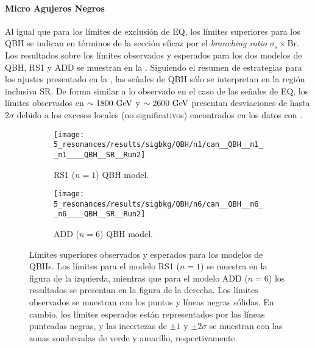 \paragraph{Micro Agujeros Negros}
\label{paragraph:results:results:bkgsig:results:qbh}

Al igual que para los límites de exclusión de \ac{EQ}, los límites superiores para los \ac{QBH} se indican en términos de la sección eficaz por el \textit{branching ratio} \(\sigma_s \times \text{Br}\).
Los resultados sobre los límites observados y esperados para los dos modelos de \ac{QBH}, RS1 y ADD se muestran en la \Fig{\ref{fig:results:results:bkgsig:results:qbh:limits}}. Siguiendo el resumen de estrategias para los ajustes presentado en la \Tab{\ref{tab:bkg:modeling:strategy_modeling:summary}}, las señales de \ac{QBH} sólo se interpretan en la región inclusiva SR. De forma similar a lo observado en el caso de las señales de \ac{EQ}, los límites observados en \(\sim 1800~\text{GeV}\) y \(\sim 2600~\text{GeV}\) presentan desviaciones de hasta \(2\sigma\) debido a los excesos locales (no significativos) encontrados en los datos con \bh.

\begin{figure}[ht!]
    \centering
    \begin{subfigure}[h]{0.49\linewidth}
        \centering
        \texttt{[image: 5\_resonances/results/sigbkg/QBH/n1/can\_\_QBH\_\_n1\_\_n1\_\_\_\_QBH\_\_SR\_\_Run2]}
        \caption{RS1 (\(n=1\)) \ac{QBH} model.}
    \end{subfigure}
    \hfill
    \begin{subfigure}[h]{0.49\linewidth}
        \centering
        \texttt{[image: 5\_resonances/results/sigbkg/QBH/n6/can\_\_QBH\_\_n6\_\_n6\_\_\_\_QBH\_\_SR\_\_Run2]}
        \caption{ADD (\(n=6\)) \ac{QBH} model.}
    \end{subfigure}
    \caption{Límites superiores observados y esperados para los modelos de \acp{QBH}. Los límites para el modelo RS1 (\(n=1\)) se muestra en la figura de la izquierda, mientras que para el modelo ADD (\(n=6\)) los resultados se presentan en la figura de la derecha. Los límites observados se muestran con los puntos y líneas negras sólidas. En cambio, los límites esperados están representados por las líneas punteadas negras, y las incertezas de \(\pm 1\) y \(\pm 2 \sigma\) se muestran con las zonas sombreadas de verde y amarillo, respectivamente.}
    \label{fig:results:results:bkgsig:results:qbh:limits}
\end{figure}

